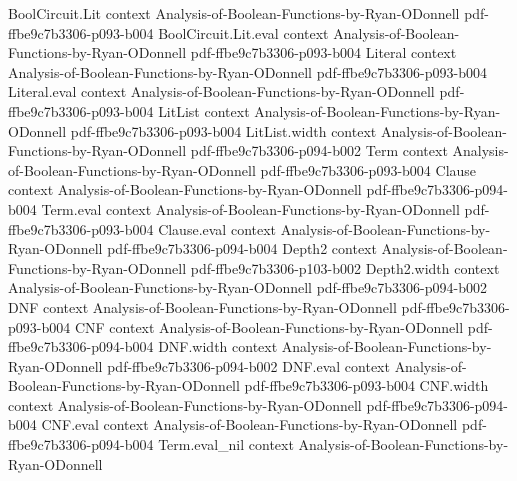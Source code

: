\begin{lemma}
\leanok
{}
\proofstep
  {BoolCircuit.Lit}
  {context}
  {Analysis-of-Boolean-Functions-by-Ryan-ODonnell}
  {pdf-ffbe9c7b3306-p093-b004}
\proofstep
  {BoolCircuit.Lit.eval}
  {context}
  {Analysis-of-Boolean-Functions-by-Ryan-ODonnell}
  {pdf-ffbe9c7b3306-p093-b004}
\proofstep
  {Literal}
  {context}
  {Analysis-of-Boolean-Functions-by-Ryan-ODonnell}
  {pdf-ffbe9c7b3306-p093-b004}
\proofstep
  {Literal.eval}
  {context}
  {Analysis-of-Boolean-Functions-by-Ryan-ODonnell}
  {pdf-ffbe9c7b3306-p093-b004}
\proofstep
  {LitList}
  {context}
  {Analysis-of-Boolean-Functions-by-Ryan-ODonnell}
  {pdf-ffbe9c7b3306-p093-b004}
\proofstep
  {LitList.width}
  {context}
  {Analysis-of-Boolean-Functions-by-Ryan-ODonnell}
  {pdf-ffbe9c7b3306-p094-b002}
\proofstep
  {Term}
  {context}
  {Analysis-of-Boolean-Functions-by-Ryan-ODonnell}
  {pdf-ffbe9c7b3306-p093-b004}
\proofstep
  {Clause}
  {context}
  {Analysis-of-Boolean-Functions-by-Ryan-ODonnell}
  {pdf-ffbe9c7b3306-p094-b004}
\proofstep
  {Term.eval}
  {context}
  {Analysis-of-Boolean-Functions-by-Ryan-ODonnell}
  {pdf-ffbe9c7b3306-p093-b004}
\proofstep
  {Clause.eval}
  {context}
  {Analysis-of-Boolean-Functions-by-Ryan-ODonnell}
  {pdf-ffbe9c7b3306-p094-b004}
\proofstep
  {Depth2}
  {context}
  {Analysis-of-Boolean-Functions-by-Ryan-ODonnell}
  {pdf-ffbe9c7b3306-p103-b002}
\proofstep
  {Depth2.width}
  {context}
  {Analysis-of-Boolean-Functions-by-Ryan-ODonnell}
  {pdf-ffbe9c7b3306-p094-b002}
\proofstep
  {DNF}
  {context}
  {Analysis-of-Boolean-Functions-by-Ryan-ODonnell}
  {pdf-ffbe9c7b3306-p093-b004}
\proofstep
  {CNF}
  {context}
  {Analysis-of-Boolean-Functions-by-Ryan-ODonnell}
  {pdf-ffbe9c7b3306-p094-b004}
\proofstep
  {DNF.width}
  {context}
  {Analysis-of-Boolean-Functions-by-Ryan-ODonnell}
  {pdf-ffbe9c7b3306-p094-b002}
\proofstep
  {DNF.eval}
  {context}
  {Analysis-of-Boolean-Functions-by-Ryan-ODonnell}
  {pdf-ffbe9c7b3306-p093-b004}
\proofstep
  {CNF.width}
  {context}
  {Analysis-of-Boolean-Functions-by-Ryan-ODonnell}
  {pdf-ffbe9c7b3306-p094-b004}
\proofstep
  {CNF.eval}
  {context}
  {Analysis-of-Boolean-Functions-by-Ryan-ODonnell}
  {pdf-ffbe9c7b3306-p094-b004}
\proofstep
  {Term.eval_nil}
  {context}
  {Analysis-of-Boolean-Functions-by-Ryan-ODonnell}

\end{lemma}
